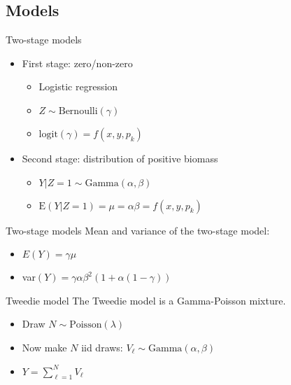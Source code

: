 \documentclass{beamer}
\begin{document}
\subsection{Models}

\begin{frame}[fragile]{Two-stage models}
  \begin{itemize}
    \item First stage: zero/non-zero
    \begin{itemize}
      \item Logistic regression
      \item $Z \sim \text{Bernoulli}(\gamma)$
      \item $\text{logit}(\gamma) = f(x,y,p_k)$
    \end{itemize}
    \item Second stage: distribution of positive biomass
    \begin{itemize}
      \item $Y|Z=1 \sim \text{Gamma}(\alpha, \beta)$
      \item $\text{E}\left(Y|Z=1\right) = \mu = \alpha \beta = f(x,y,p_k)$
    \end{itemize}
  \end{itemize}
\end{frame}


\begin{frame}[fragile]{Two-stage models}
  Mean and variance of the two-stage model:\\
  \begin{itemize}
    \item $E(Y) = \gamma \mu$
    \item var$(Y) = \gamma \alpha \beta^2 \left(1 + \alpha(1-\gamma)\right) $
  \end{itemize}
\end{frame}



\begin{frame}[fragile]{Tweedie model}
  The Tweedie model is a Gamma-Poisson mixture.\\
  \begin{itemize}
    \item Draw $N \sim \text{Poisson}(\lambda)$
    \item Now make $N$ iid draws: $V_{\ell} \sim \text{Gamma}(\alpha, \beta)$
    \item $Y = \sum\limits_{\ell=1}^N  V_{\ell}$
  \end{itemize}
\end{frame}
\end{document}
